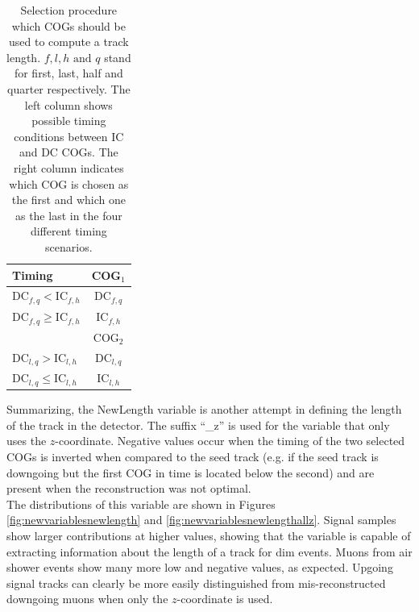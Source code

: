 \begin{table}[]
\caption{Selection procedure which COGs should be used to compute a track length. $f, l, h \textrm{ and } q$ stand for first, last, half and quarter respectively. The left column shows possible timing conditions between IC and DC COGs. The right column indicates which COG is chosen as the first and which one as the last in the four different timing scenarios.}
\label{table:newlength}
\centering
\begin{tabular}{|l |c|}
\hline
\cellcolor[HTML]{F1A91E}Timing & \cellcolor[HTML]{F1A91E}COG$_1$ \\ \hline
$\textrm{DC}_{f,q} < \textrm{IC}_{f,h}$ & DC$_{f,q}$ \\ \hline
$\textrm{DC}_{f,q} \geq \textrm{IC}_{f,h}$ & IC$_{f,h}$ \\ \hline
\cellcolor[HTML]{F1A91E} & \cellcolor[HTML]{F1A91E}COG$_2$ \\ \hline
$\textrm{DC}_{l,q} > \textrm{IC}_{l,h}$ & DC$_{l,q}$ \\ \hline
$\textrm{DC}_{l,q} \leq \textrm{IC}_{l,h}$ & IC$_{l,h}$ \\ \hline
\end{tabular}
\end{table} 
 
\noindent Summarizing, the NewLength variable is another attempt in defining the length of the track in the detector. The suffix ``\_z'' is used for the variable that only uses the $z$-coordinate. Negative values occur when the timing of the two selected COGs is inverted when compared to the seed track (e.g. if the seed track is downgoing but the first COG in time is located below the second) and are present when the reconstruction was not optimal.\\

\noindent The distributions of this variable are shown in Figures \ref{fig:newvariablesnewlength} and \ref{fig:newvariablesnewlengthallz}. Signal samples show larger contributions at higher values, showing that the variable is capable of extracting information about the length of a track for dim events. Muons from air shower events show many more low and negative values, as expected. Upgoing signal tracks can clearly be more easily distinguished from mis-reconstructed downgoing muons when only the $z$-coordinate is used.

